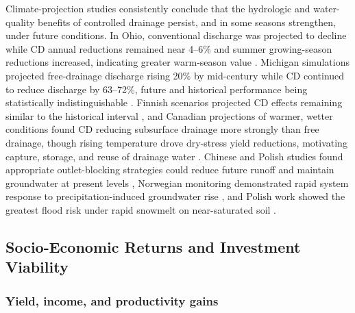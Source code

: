 Climate-projection studies consistently conclude that the hydrologic and
water-quality benefits of controlled drainage persist, and in some seasons
strengthen, under future conditions. In Ohio, conventional discharge was
projected to decline while CD annual reductions remained near 4--6\% and summer
growing-season reductions increased, indicating greater warm-season value
\parencite{Pease2017}. Michigan simulations projected free-drainage discharge
rising 20\% by mid-century while CD continued to reduce discharge by 63--72\%,
future and historical performance being statistically indistinguishable
\parencite{BinShokrana2023}. Finnish scenarios projected CD effects remaining
similar to the historical interval \parencite{Salla2022}, and Canadian projections
of warmer, wetter conditions found CD reducing subsurface drainage more strongly
than free drainage, though rising temperature drove dry-stress yield reductions,
motivating capture, storage, and reuse of drainage water
\parencite{Ndulue2024,Gunn2018}. Chinese and Polish studies found appropriate
outlet-blocking strategies could reduce future runoff and maintain groundwater at
present levels \parencite{Awad2021,Sojka2020}, Norwegian monitoring demonstrated
rapid system response to precipitation-induced groundwater rise
\parencite{Deelstra2015}, and Polish work showed the greatest flood risk under
rapid snowmelt on near-saturated soil \parencite{Szejba2020}.

\subsection{Socio-Economic Returns and Investment Viability}

\subsubsection{Yield, income, and productivity gains}

